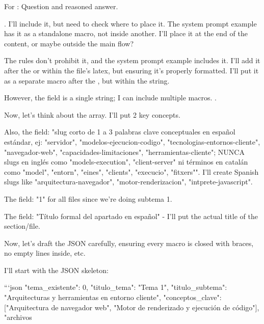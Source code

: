 For : Question and reasoned answer.

. I'll include it, but need to check where to place it. The system prompt example has it as a standalone macro, not inside another. I'll place it at the end of the  content, or maybe outside the main flow?

The rules don't prohibit it, and the system prompt example includes it. I'll add it after the \cmd{\nota} or within the file's latex, but ensuring it's properly formatted. I'll put it as a separate macro after the \cmd{\nota}, but within the  string.

However, the  field is a single string; I can include multiple macros. .

Now, let's think about the  array. I'll put 2 key concepts.

Also, the  field: "slug corto de 1 a 3 palabras clave conceptuales en español estándar, ej: "servidor", "modelos-ejecucion-codigo", "tecnologias-entornos-cliente", "navegador-web", "capacidades-limitaciones", "herramientas-cliente"; NUNCA slugs en inglés como "models-execution", "client-server" ni términos en catalán como "model", "entorn", "eines", "clients", "execucio", "fitxers"". I'll create Spanish slugs like "arquitectura-navegador", "motor-renderizacion", "intprete-javascript".

The  field: "1" for all files since we're doing subtema 1.

The  field: "Título formal del apartado en español" - I'll put the actual title of the section/file.

Now, let's draft the JSON carefully, ensuring every macro is closed with braces, no empty lines inside, etc.

I'll start with the JSON skeleton:

```json
{
  "tema\_existente": 0,
  "titulo\_tema": "Tema 1",
  "titulo\_subtema": "Arquitecturas y herramientas en entorno cliente",
  "conceptos\_clave": ["Arquitectura de navegador web", "Motor de renderizado y ejecución de código"],
  "archivos}
